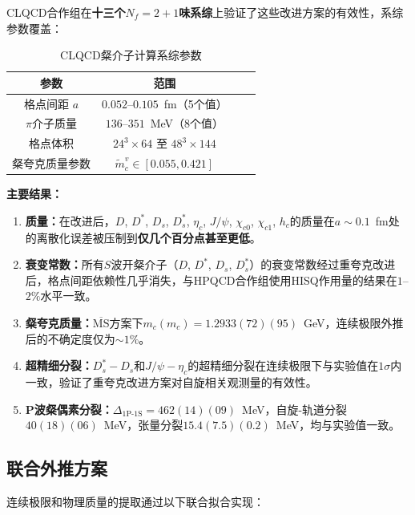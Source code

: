 \documentclass[12pt,a4paper]{ctexart}
\theoremstyle{definition}
\begin{document}
CLQCD合作组\cite{CLQCD2024charm}在\textbf{十三个$N_f=2+1$味系综}上验证了这些改进方案的有效性，系综参数覆盖：

\begin{table}[H]
\centering
\caption{CLQCD粲介子计算系综参数\cite{CLQCD2024charm}}
\label{tab:charm_ensembles}
\begin{tabular}{cccc}
\toprule
参数 & 范围 \\
\midrule
格点间距 $a$ & $0.052\text{--}0.105$~fm（5个值） \\
$\pi$介子质量 & $136\text{--}351$~MeV（8个值） \\
格点体积 & $24^3\times 64$ 至 $48^3\times 144$ \\
粲夸克质量参数 & $\tilde{m}^v_c \in [0.055, 0.421]$ \\
\bottomrule
\end{tabular}
\end{table}

\textbf{主要结果：}

\begin{enumerate}
    \item \textbf{质量：}在改进后，$D$, $D^*$, $D_s$, $D^*_s$, $\eta_c$, $J/\psi$, $\chi_{c0}$, $\chi_{c1}$, $h_c$的质量在$a \sim 0.1$~fm处的离散化误差被压制到\textbf{仅几个百分点甚至更低}。

    \item \textbf{衰变常数：}所有$S$波开粲介子（$D$, $D^*$, $D_s$, $D^*_s$）的衰变常数经过重夸克改进后，格点间距依赖性几乎消失，与HPQCD合作组使用HISQ作用量的结果在$1$--$2\%$水平一致。

    \item \textbf{粲夸克质量：}$\overline{\text{MS}}$方案下$m_c(m_c) = 1.2933(72)(95)$~GeV，连续极限外推后的不确定度仅为$\sim 1\%$。

    \item \textbf{超精细分裂：}$D^*_s - D_s$和$J/\psi - \eta_c$的超精细分裂在连续极限下与实验值在$1\sigma$内一致，验证了重夸克改进方案对自旋相关观测量的有效性。

    \item \textbf{P波粲偶素分裂：}$\Delta_{\text{1P-1S}} = 462(14)(09)$~MeV，自旋-轨道分裂$40(18)(06)$~MeV，张量分裂$15.4(7.5)(0.2)$~MeV，均与实验值一致。
\end{enumerate}

\subsection{联合外推方案}

连续极限和物理质量的提取通过以下联合拟合实现\cite{CLQCD2024charm}：
\end{document}

